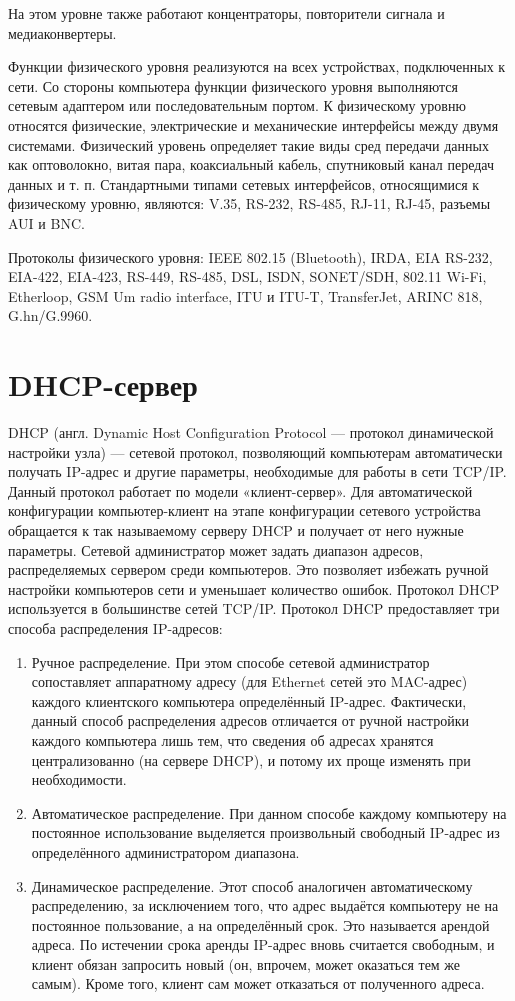 \documentclass[a4paper,12pt]{article}
\begin{document}
		На этом уровне также работают концентраторы, повторители сигнала и медиаконвертеры.
		
		Функции физического уровня реализуются на всех устройствах, подключенных к сети. Со стороны компьютера функции физического уровня выполняются сетевым адаптером или последовательным портом. К физическому уровню относятся физические, электрические и механические интерфейсы между двумя системами. Физический уровень определяет такие виды сред передачи данных как оптоволокно, витая пара, коаксиальный кабель, спутниковый канал передач данных и т. п. Стандартными типами сетевых интерфейсов, относящимися к физическому уровню, являются: V.35, RS-232, RS-485, RJ-11, RJ-45, разъемы AUI и BNC.
		
		Протоколы физического уровня: IEEE 802.15 (Bluetooth), IRDA, EIA RS-232, EIA-422, EIA-423, RS-449, RS-485, DSL, ISDN, SONET/SDH, 802.11 Wi-Fi, Etherloop, GSM Um radio interface, ITU и ITU-T, TransferJet, ARINC 818, G.hn/G.9960.
		\section{DHCP-сервер}
		DHCP (англ. Dynamic Host Configuration Protocol — протокол динамической настройки узла) — сетевой протокол, позволяющий компьютерам автоматически получать IP-адрес и другие параметры, необходимые для работы в сети TCP/IP. Данный протокол работает по модели «клиент-сервер». Для автоматической конфигурации компьютер-клиент на этапе конфигурации сетевого устройства обращается к так называемому серверу DHCP и получает от него нужные параметры. Сетевой администратор может задать диапазон адресов, распределяемых сервером среди компьютеров. Это позволяет избежать ручной настройки компьютеров сети и уменьшает количество ошибок. Протокол DHCP используется в большинстве сетей TCP/IP.
		Протокол DHCP предоставляет три способа распределения IP-адресов:
		\begin{enumerate}
		\item Ручное распределение. При этом способе сетевой администратор сопоставляет аппаратному адресу (для Ethernet сетей это MAC-адрес) каждого клиентского компьютера определённый IP-адрес. Фактически, данный способ распределения адресов отличается от ручной настройки каждого компьютера лишь тем, что сведения об адресах хранятся централизованно (на сервере DHCP), и потому их проще изменять при необходимости.\\
		\item Автоматическое распределение. При данном способе каждому компьютеру на постоянное использование выделяется произвольный свободный IP-адрес из определённого администратором диапазона. \\
		\item Динамическое распределение. Этот способ аналогичен автоматическому распределению, за исключением того, что адрес выдаётся компьютеру не на постоянное пользование, а на определённый срок. Это называется арендой адреса. По истечении срока аренды IP-адрес вновь считается свободным, и клиент обязан запросить новый (он, впрочем, может оказаться тем же самым). Кроме того, клиент сам может отказаться от полученного адреса.
	\end{enumerate}
		
\end{document}
